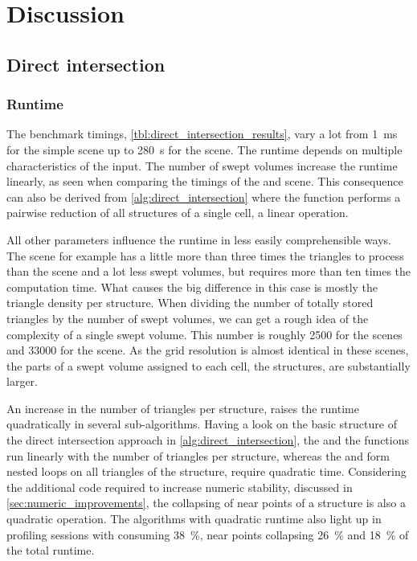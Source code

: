 
\chapter{Discussion}
\label{ch:discussion}


\section{Direct intersection}
\label{sec:direct_intersection_discussion}


\subsection{Runtime}

The benchmark timings, \cf \cref{tbl:direct_intersection_results}, vary a lot from \SI{1}{\milli\second} for the simple \cubes scene up to \SI{280}{\second} for the \turbine scene.
The runtime depends on multiple characteristics of the input.
The number of swept volumes increase the runtime linearly, as seen when comparing the timings of the \impeller and \impellerhalf scene.
This consequence can also be derived from \cref{alg:direct_intersection} where the  function performs a pairwise reduction of all structures of a single cell, a linear operation.

All other parameters influence the runtime in less easily comprehensible ways.
The \turbine scene for example has a little more than three times the triangles to process than the \impeller scene and a lot less swept volumes, but requires more than ten times the computation time.
What causes the big difference in this case is mostly the triangle density per structure.
When dividing the number of totally stored triangles by the number of swept volumes, we can get a rough idea of the complexity of a single swept volume.
This number is roughly 2500 for the \impeller scenes and 33000 for the \turbine scene.
As the grid resolution is almost identical in these scenes, the parts of a swept volume assigned to each cell, \ie the structures, are substantially larger.

An increase in the number of triangles per structure, raises the runtime quadratically in several sub-algorithms.
Having a look on the basic structure of the direct intersection approach in \cref{alg:direct_intersection}, the  and the  functions run linearly with the number of triangles per structure, whereas the  and  form nested loops on all triangles of the structure, \ie require quadratic time.
Considering the additional code required to increase numeric stability, discussed in \cref{sec:numeric_improvements}, the collapsing of near points of a structure is also a quadratic operation.
The algorithms with quadratic runtime also light up in profiling sessions with  consuming \SI{38}{\percent}, near points collapsing \SI{26}{\percent} and  \SI{18}{\percent} of the total runtime.

